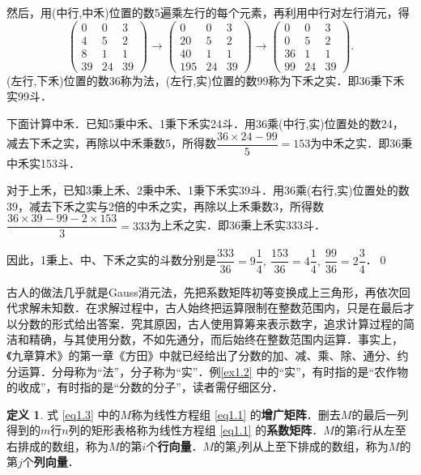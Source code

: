 \documentclass[a4paper,fontset=windows]{ctexbook}
\theoremstyle{definition}
\newtheorem{definition}{定义}[chapter]
\begin{document}
然后，用(中行,中禾)位置的数5遍乘左行的每个元素，再利用中行对左行消元，得
$$\begin{pmatrix}0&0&3 \\ 4&5&2 \\ 8&1&1 \\ 39&24&39\end{pmatrix}\to\begin{pmatrix}0&0&3 \\ 20&5&2 \\ 40&1&1 \\ 195&24&39\end{pmatrix}\to\begin{pmatrix}0&0&3 \\ 0&5&2 \\ 36&1&1 \\ 99&24&39\end{pmatrix}.$$
(左行,下禾)位置的数36称为法，(左行,实)位置的数99称为下禾之实．即36秉下禾实99斗．

下面计算中禾．已知5秉中禾、1秉下禾实24斗．用36乘(中行,实)位置处的数24，减去下禾之实，再除以中禾秉数5，所得数$\dfrac{36\times 24-99}{5}=153$为中禾之实．即36秉中禾实153斗．

对于上禾，已知3秉上禾、2秉中禾、1秉下禾实39斗．用36乘(右行,实)位置处的数39，减去下禾之实与2倍的中禾之实，再除以上禾秉数3，所得数$\dfrac{36\times 39-99-2\times 153}{3}=333$为上禾之实．即36秉上禾实333斗．

因此，1秉上、中、下禾之实的斗数分别是$\dfrac{333}{36}=9\dfrac{1}{4},~\dfrac{153}{36}=4\dfrac{1}{4},~\dfrac{99}{36}=2\dfrac{3}{4}$．\qed

\bigskip 古人的做法几乎就是Gauss消元法，先把系数矩阵初等变换成上三角形，再依次回代求解未知数．在求解过程中，古人始终把运算限制在整数范围内，只是在最后才以分数的形式给出答案．究其原因，古人使用算筹来表示数字，追求计算过程的简洁和精确，与其使用分数，不如先通分，而后始终在整数范围内运算．事实上，《九章算术》的第一章《方田》中就已经给出了分数的加、减、乘、除、通分、约分运算．分母称为“法”，分子称为“实”．例\ref{ex1.2} 中的“实”，有时指的是“农作物的收成”，有时指的是“分数的分子”，读者需仔细区分．

\begin{definition}
式 \eqref{eq1.3} 中的$M$称为线性方程组 \eqref{eq1.1} 的{\bf 增广矩阵}．删去$M$的最后一列得到的$m$行$n$列的矩形表格称为线性方程组 \eqref{eq1.1} 的{\bf 系数矩阵}．$M$的第$i$行从左至右排成的数组，称为$M$的第$i$个{\bf 行向量}．$M$的第$j$列从上至下排成的数组，称为$M$的第$j$个{\bf 列向量}．
\end{definition}
\end{document}
